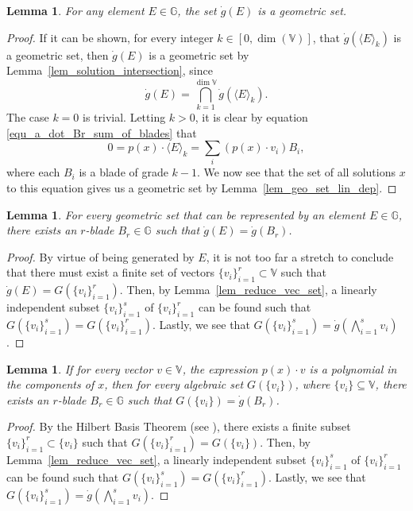 \documentclass{birkjour}
\newtheorem{lem}[thm]{Lemma}
\theoremstyle{definition}
\theoremstyle{remark}
\numberwithin{equation}{section}
\newcommand{\G}{\mathbb{G}}
\newcommand{\V}{\mathbb{V}}
\newcommand{\gd}{\dot{g}}
\begin{document}
\begin{lem}
For any element $E\in\G$, the set $\gd(E)$ is a geometric set.
\end{lem}
\begin{proof}
If it can be shown, for every integer $k\in[0,\dim(\V)]$, that $\gd(\langle E\rangle_k)$ is a geometric set,
then $\gd(E)$ is a geometric set by Lemma~\ref{lem_solution_intersection}, since
\begin{equation*}
\gd(E) = \bigcap_{k=1}^{\dim{\V}}\gd(\langle E\rangle_k).
\end{equation*}
The case $k=0$ is trivial.  Letting $k>0$, it is clear by equation \eqref{equ_a_dot_Br_sum_of_blades} that
\begin{equation*}
0 = p(x)\cdot\langle E\rangle_k = \sum_i (p(x)\cdot v_i)B_i,
\end{equation*}
where each $B_i$ is a blade of grade $k-1$.  We now see that the set of all solutions $x$
to this equation gives us a geometric set by Lemma~\ref{lem_geo_set_lin_dep}.
\end{proof}

\begin{lem}\label{lem_all_geo_sets_rep_by_blades}
For every geometric set that can be represented by an element $E\in\G$,
there exists an $r$-blade $B_r\in\G$ such that $\gd(E)=\gd(B_r)$.
\end{lem}
\begin{proof}
By virtue of being generated by $E$, it is not too far a stretch to conclude that
there must exist a finite set of vectors $\{v_i\}_{i=1}^r\subset\V$ such that
$\gd(E)=G(\{v_i\}_{i=1}^r)$.  Then, by Lemma~\ref{lem_reduce_vec_set}, a linearly independent subset $\{v_i\}_{i=1}^s$
of $\{v_i\}_{i=1}^r$ can be found such that $G(\{v_i\}_{i=1}^s)=G(\{v_i\}_{i=1}^r)$.
Lastly, we see that $G(\{v_i\}_{i=1}^s)=\gd(\bigwedge_{i=1}^s v_i)$.
\end{proof}

\begin{lem}
If for every vector $v\in\V$, the expression $p(x)\cdot v$ is a polynomial in the components of $x$,
then for every algebraic set $G(\{v_i\})$, where $\{v_i\}\subseteq\V$, there exists an $r$-blade $B_r\in\G$ such that
$G(\{v_i\})=\gd(B_r)$.
\end{lem}
\begin{proof}
By the Hilbert Basis Theorem (see \cite[p. 204]{Garrity13}), there exists a finite subset $\{v_i\}_{i=1}^r\subset\{v_i\}$
such that $G(\{v_i\}_{i=1}^r)=G(\{v_i\})$.  Then, by Lemma~\ref{lem_reduce_vec_set}, a linearly independent subset $\{v_i\}_{i=1}^s$
of $\{v_i\}_{i=1}^r$ can be found such that $G(\{v_i\}_{i=1}^s)=G(\{v_i\}_{i=1}^r)$.
Lastly, we see that $G(\{v_i\}_{i=1}^s)=\gd(\bigwedge_{i=1}^s v_i)$.
\end{proof}
\end{document}
